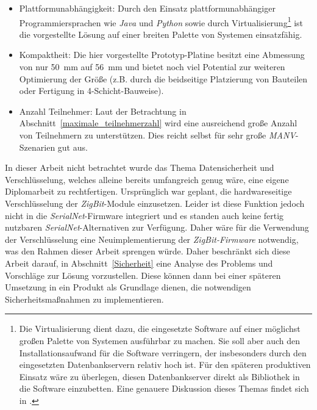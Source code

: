 \begin{itemize}
    \item{Plattformunabhängigkeit:} Durch den Einsatz plattformunabhängiger Programmiersprachen wie \emph{Java}
          und \emph{Python} sowie durch Virtualisierung\footnote{Die Virtualisierung dient dazu, die
              eingesetzte Software auf einer möglichst großen Palette von Systemen ausführbar zu machen. Sie
              soll aber auch den Installationsaufwand für die Software verringern, der insbesonders durch den
              eingesetzten Datenbankservern relativ hoch ist. Für den späteren produktiven Einsatz wäre zu
              überlegen, diesen Datenbankserver direkt als Bibliothek in die Software einzubetten. Eine
              genauere Diskussion dieses Themas findet sich in \cite{Jan}.} ist die vorgestellte Lösung auf
          einer breiten Palette von Systemen einsatzfähig.

    \item{Kompaktheit:} Die hier vorgestellte Prototyp-Platine besitzt eine Abmessung von nur
          50~mm auf 56~mm und bietet noch viel Potential zur weiteren Optimierung der Größe (z.B. durch
          die beidseitige Platzierung von Bauteilen oder Fertigung in 4-Schicht-Bauweise).

    \item{Anzahl Teilnehmer:} Laut der Betrachtung in Abschnitt~\ref{maximale_teilnehmerzahl} wird eine ausreichend
                              große Anzahl von Teilnehmern zu unterstützen. Dies reicht selbst für sehr große
                              \emph{MANV}-Szenarien gut aus.
\end{itemize}

In dieser Arbeit nicht betrachtet wurde das Thema Datensicherheit und Verschlüsselung, welches alleine bereits
umfangreich genug wäre, eine eigene Diplomarbeit zu rechtfertigen. Ursprünglich war geplant, die hardwareseitige
Verschlüsselung der \emph{ZigBit}-Module einzusetzen. Leider ist diese Funktion jedoch nicht in die 
\emph{SerialNet}-Firmware integriert und es standen auch keine fertig nutzbaren \emph{SerialNet}-Alternativen zur Verfügung. 
Daher wäre für die Verwendung der Verschlüsselung eine Neuimplementierung der
\emph{ZigBit-Firmware} notwendig, was den Rahmen dieser Arbeit sprengen würde. Daher beschränkt 
sich diese Arbeit darauf, in Abschnitt~\ref{Sicherheit} eine Analyse des Problems und 
Vorschläge zur Lösung vorzustellen. Diese können dann bei einer späteren Umsetzung in ein Produkt als Grundlage
dienen, die notwendigen Sicherheitsmaßnahmen zu implementieren.
